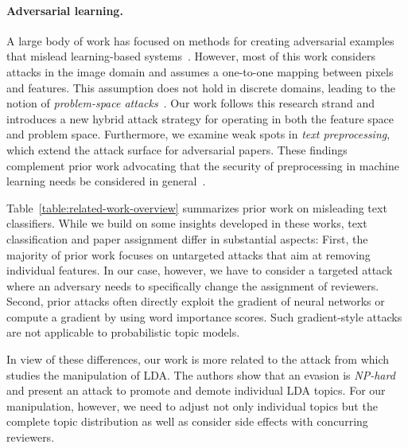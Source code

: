 \documentclass[letterpaper,twocolumn,10pt]{article}
\begin{document}
\paragraph{Adversarial learning.} A large body of work has focused on methods for creating adversarial examples that mislead learning-based systems~\cite{biggio-18-wild}. However, most of this work considers attacks in the image domain and assumes a one-to-one mapping between {pixels\EndAccSupp{}} and features. This assumption does not hold in discrete domains, leading to the notion of \emph{problem-space attacks}~\cite{pierazzi-20-intriguing, quiring-19-misleading}. Our work follows this research strand and introduces a new hybrid attack strategy for operating in both the feature space and problem space.
Furthermore, we examine weak spots in \emph{text preprocessing}, which extend the attack surface for adversarial papers. 
These findings complement prior work advocating that the security of preprocessing in machine learning needs be considered in general~\cite{quiring-20-adversarial}. 

Table~\ref{table:related-work-overview} summarizes prior work on misleading text classifiers. While we build on some insights developed in these works, text classification and paper assignment differ in substantial aspects: First, the majority of prior work focuses on {untargeted\EndAccSupp{}} attacks that aim at removing individual features. In our case, however, we have to consider a targeted attack where an adversary needs to specifically change the assignment of reviewers. Second, prior attacks often directly exploit the {gradient\EndAccSupp{}} of {neural\EndAccSupp{}} networks or compute a {gradient\EndAccSupp{}} by using word importance scores. Such gradient-style attacks are not applicable to probabilistic topic models. 

In view of these differences, our work is more related to the attack from \citet{zhou-20-evalda} which studies the manipulation of \ac{LDA}. The authors show that an evasion is \emph{NP-hard} and present an attack to promote and {demote\EndAccSupp{}} individual \ac{LDA} topics. For our manipulation, however, we need to adjust not only individual topics but the complete topic distribution as well as consider side effects with concurring reviewers. 
\end{document}
